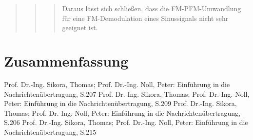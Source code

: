 \begin{quote}
\begin{quote}
\begin{quote}
        Daraus lässt sich schließen, dass die FM-PFM-Umwandlung
        für eine FM-Demodulation eines Sinussignals nicht sehr geeignet ist.\\
        
    	\end{quote}
    \end{quote}	
\end{quote}


\section{Zusammenfassung}
\begin{quote}
	
\end{quote}



\begin{thebibliography}{999}
 Prof. Dr.-Ing. Sikora, Thomas; Prof. Dr.-Ing. Noll, Peter: Einführung in die
Nachrichtenübertragung, S.207
 Prof. Dr.-Ing. Sikora, Thomas; Prof. Dr.-Ing. Noll, Peter: Einführung in die
Nachrichtenübertragung, S.209
 Prof. Dr.-Ing. Sikora, Thomas; Prof. Dr.-Ing. Noll, Peter: Einführung in die
Nachrichtenübertragung, S.206
 Prof. Dr.-Ing. Sikora, Thomas; Prof. Dr.-Ing. Noll, Peter: Einführung in die
Nachrichtenübertragung, S.215



\end{thebibliography}


